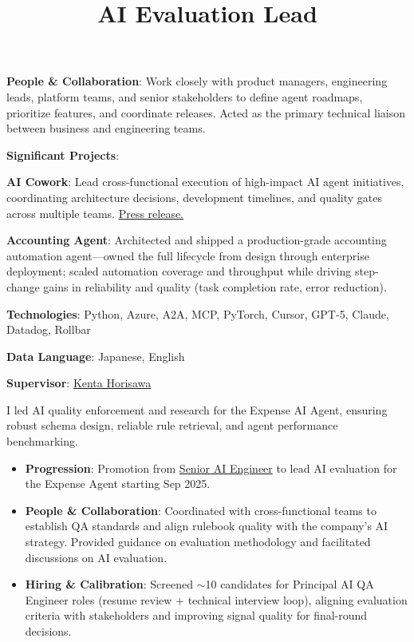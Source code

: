 \documentclass[margin]{res}
\newcommand{\SubItem}[1]{
    {\setlength\itemindent{15pt} \item[-] #1}
}
\begin{document}
\begin{resume}
\begin{position}
\begin{itemize}
    \item \textbf{People \& Collaboration}: Work closely with product managers, engineering leads, platform teams, and senior stakeholders to define agent roadmaps, prioritize features, and coordinate releases. Acted as the primary technical liaison between business and engineering teams.
    \item \textbf{Significant Projects}:
    \SubItem{\textbf{AI Cowork}: Lead cross-functional execution of high-impact AI agent initiatives, coordinating architecture decisions, development timelines, and quality gates across multiple teams. \href{https://corp.moneyforward.com/en/news/release/service/20260407-mf-press-1/}{Press release.}}
    \SubItem{\textbf{Accounting Agent}: Architected and shipped a production-grade accounting automation agent—owned the full lifecycle from design through enterprise deployment; scaled automation coverage and throughput while driving step-change gains in reliability and quality (task completion rate, error reduction).}
    \item \textbf{Technologies}: Python, Azure, A2A, MCP, PyTorch, Cursor, GPT-5, Claude, Datadog, Rollbar
    \item \textbf{Data Language}: Japanese, English
    \item \textbf{Supervisor}: \href{https://www.linkedin.com/in/%E5%81%A5%E5%A4%AA-%E5%A0%80%E6%BE%A4-5934491b8/}{Kenta Horisawa}
\end{itemize}
\end{position}
\employer{} %
\location{} %
\title{\textbf{AI Evaluation Lead}} 
\begin{position}
I led AI quality enforcement and research for the Expense AI Agent, ensuring robust schema design, reliable rule retrieval, and agent performance benchmarking.\\
\vspace{-3mm}
\begin{itemize}
    \item \textbf{Progression}: Promotion from \hyperlink{seniorAI}{Senior AI Engineer} to lead AI evaluation for the Expense Agent starting Sep 2025.
    \item \textbf{People \& Collaboration}: Coordinated with cross-functional teams to establish QA standards and align rulebook quality with the company’s AI strategy. Provided guidance on evaluation methodology and facilitated discussions on AI evaluation.
    \item \textbf{Hiring \& Calibration}: Screened $\sim$10 candidates for Principal AI QA Engineer roles (resume review + technical interview loop), aligning evaluation criteria with stakeholders and improving signal quality for final-round decisions.

\end{itemize}
\end{position}
\end{resume}
\end{document}
